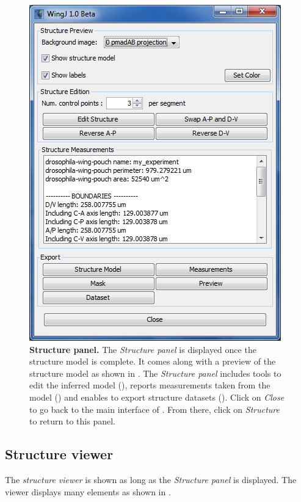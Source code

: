\begin{figure}[!h]
\centering
\includegraphics[scale=0.6]{images/wingj_structure_panel.jpg}
\caption{\textbf{Structure panel.} The \emph{Structure panel} is displayed once the structure model is complete. It comes along with a preview of the structure model as shown in . The \textit{Structure panel} includes tools to edit the inferred model (), reports measurements taken from the model () and enables to export structure datasets (). Click on \textit{Close} to go back to the main interface of \wingj. From there, click on \textit{Structure} to return to this panel.}
\label{fig:wingj_structure_panel}
\end{figure}

\subsection{Structure viewer}
The \emph{structure viewer} is shown as long as the \textit{Structure panel} is displayed. The viewer displays many elements as shown in .

